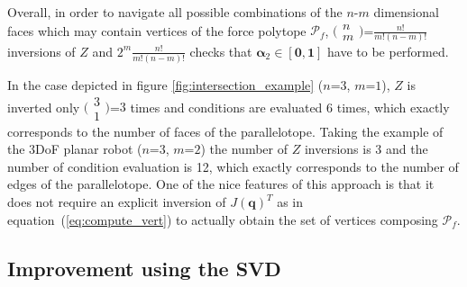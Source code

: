 Overall, in order to navigate all possible combinations of the $n$-$m$ dimensional faces which may contain vertices of the force polytope $\mathcal{P}_f$, $\big(\begin{smallmatrix}n\\m\end{smallmatrix}\big)$=$\frac{n!}{m!(n-m)!}$ inversions of $Z$ and  $2^m \frac{n!}{m!(n-m)!}$ checks that $\bm{\alpha}_2 \in [\bm{0},\bm{1}]$ have to be performed.

In the case depicted in figure \ref{fig:intersection_example} ($n$=$3$, $m$=$1$), $Z$ is inverted only $\big(\begin{smallmatrix}3\\1\end{smallmatrix}\big)$=$3$ times and conditions are evaluated 6 times, which exactly corresponds to the number of faces of the parallelotope. Taking the example of the 3DoF planar robot ($n$=$3$, $m$=$2$) the number of $Z$ inversions is 3 and the number of condition evaluation is 12, which exactly corresponds to the number of edges of the parallelotope. One of the nice features of this approach is that it does not require an explicit inversion of $J(\bm{q})^T$ as in equation~(\ref{eq:compute_vert}) to actually obtain the set of vertices composing $\mathcal{P}_f$.  

\subsection{Improvement using the SVD}

